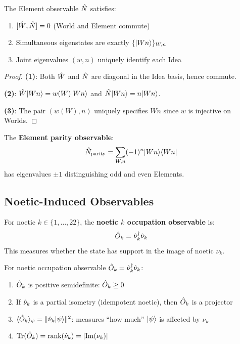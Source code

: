 \begin{proposition}
\label{prop:element-observable}
The Element observable $\hat{N}$ satisfies:
\begin{enumerate}
  \item $[\hat{W}, \hat{N}] = 0$ (World and Element commute)
  \item Simultaneous eigenstates are exactly $\{|Wn\rangle\}_{W,n}$
  \item Joint eigenvalues $(w, n)$ uniquely identify each Idea
\end{enumerate}
\end{proposition}

\begin{proof}
\textbf{(1)}: Both $\hat{W}$ and $\hat{N}$ are diagonal in the Idea basis, hence commute.

\textbf{(2)}: $\hat{W}|Wn\rangle = w(W)|Wn\rangle$ and $\hat{N}|Wn\rangle = n|Wn\rangle$.

\textbf{(3)}: The pair $(w(W), n)$ uniquely specifies $Wn$ since $w$ is injective on Worlds.
\end{proof}

\begin{definition}
\label{def:element-parity}
The \textbf{Element parity observable}:
\[
\hat{N}_{\mathrm{parity}} = \sum_{W,n} (-1)^n |Wn\rangle\langle Wn|
\]
has eigenvalues $\pm 1$ distinguishing odd and even Elements.
\end{definition}

\subsection{Noetic-Induced Observables}

\begin{definition}
\label{def:noetic-occupation}
For noetic $k \in \{1, \ldots, 22\}$, the \textbf{noetic $k$ occupation observable} is:
\[
\hat{O}_k = \hat{\nu}_k^\dagger \hat{\nu}_k
\]
This measures whether the state has support in the image of noetic $\nu_k$.
\end{definition}

\begin{proposition}
\label{prop:noetic-occupation}
For noetic occupation observable $\hat{O}_k = \hat{\nu}_k^\dagger \hat{\nu}_k$:
\begin{enumerate}
  \item $\hat{O}_k$ is positive semidefinite: $\hat{O}_k \geq 0$
  \item If $\hat{\nu}_k$ is a partial isometry (idempotent noetic), then $\hat{O}_k$ is a projector
  \item $\langle \hat{O}_k \rangle_\psi = \|\hat{\nu}_k|\psi\rangle\|^2$: measures ``how much'' $|\psi\rangle$ is affected by $\nu_k$
  \item $\mathrm{Tr}(\hat{O}_k) = \mathrm{rank}(\hat{\nu}_k) = |\mathrm{Im}(\nu_k)|$
\end{enumerate}
\end{proposition}

